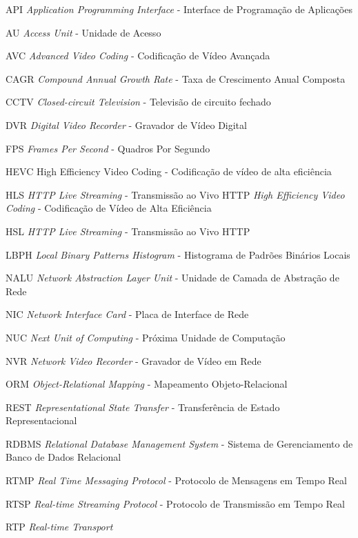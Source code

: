 \documentclass[12pt, %
openright, 
oneside, %
a4paper,    %
brazil]{facom-ufu-abntex2}
\begin{document}
\begin{siglas}
	\item[API] \textit{Application Programming Interface} - Interface de
	Programação de Aplicações \item[AU] \textit{Access Unit} - Unidade de
	Acesso \item[AVC] \textit{Advanced Video Coding} - Codificação de Vídeo
	Avançada \item[CAGR] \textit{Compound Annual Growth Rate} - Taxa de Crescimento
	Anual Composta \item[CCTV] \textit{Closed-circuit Television} - Televisão de
	circuito fechado \item[DVR] \textit{Digital Video Recorder} - Gravador de Vídeo
	Digital \item[FPS] \textit{Frames Per Second} - Quadros Por Segundo \item[HEVC]
	High Efficiency Video Coding - Codificação de vídeo de alta eficiência
	\item[HLS] \textit{HTTP Live Streaming} - Transmissão ao Vivo HTTP \textit{High
		Efficiency Video Coding} - Codificação de Vídeo de Alta Eficiência \item[HSL]
	\textit{HTTP Live Streaming} - Transmissão ao Vivo HTTP \item[LBPH]
	\textit{Local Binary Patterns Histogram} - Histograma de Padrões Binários
	Locais \item[NALU] \textit{Network Abstraction Layer Unit} - Unidade de Camada
	de Abstração de Rede \item[NIC] \textit{Network Interface Card} - Placa de
	Interface de Rede \item[NUC] \textit{Next Unit of Computing} - Próxima Unidade
	de Computação \item[NVR] \textit{Network Video Recorder} - Gravador de Vídeo em
	Rede \item[ORM] \textit{Object-Relational Mapping} - Mapeamento
	Objeto-Relacional \item[REST] \textit{Representational State Transfer} -
	Transferência de Estado Representacional  \item[RDBMS] \textit{Relational
		Database Management System} - Sistema de Gerenciamento de Banco de Dados
	Relacional \item[RTMP] \textit{Real Time Messaging Protocol} - Protocolo de
	Mensagens em Tempo Real \item[RTSP] \textit{Real-time Streaming Protocol} -
	Protocolo de Transmissão em Tempo Real \item[RTP] \textit{Real-time Transport
}
\end{siglas}
\end{document}

